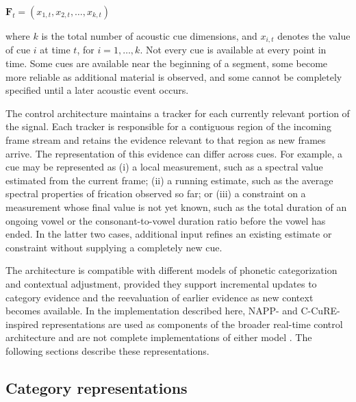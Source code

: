 \documentclass[12pt]{article}
\begin{document}
\begin{exe}
\ex $\mathbf{F}_t = (x_{1,t}, x_{2,t}, \ldots, x_{k,t})$
\end{exe}

where $k$ is the total number of acoustic cue dimensions, and $x_{i,t}$ denotes the value of cue $i$ at time $t$, for $i=1,\ldots,k$.
%
Not every cue is available at every point in time.
%
Some cues are available near the beginning of a segment, some become more reliable as additional material is observed, and some cannot be completely specified until a later acoustic event occurs. 

The control architecture maintains a tracker for each currently relevant portion of the signal.
%
Each tracker is responsible for a contiguous region of the incoming frame stream and retains the evidence relevant to that region as new frames arrive.
%
The representation of this evidence can differ across cues.
%
For example, a cue may be represented as (i) a local measurement, such as a spectral value estimated from the current frame; (ii) a running estimate, such as the average spectral properties of frication observed so far; or (iii) a constraint on a measurement whose final value is not yet known, such as the total duration of an ongoing vowel or the consonant-to-vowel duration ratio before the vowel has ended.
%
In the latter two cases, additional input refines an existing estimate or constraint without supplying a completely new cue.

The architecture is compatible with different models of phonetic categorization and contextual adjustment, provided they support incremental updates to category evidence and the reevaluation of earlier evidence as new context becomes available.
%
In the implementation described here, NAPP- and C-CuRE-inspired representations are used as components of the broader real-time control architecture and are not complete implementations of either model \citep{Nearey1997,McMurrayJongman2011}.
%
The following sections describe these representations.

\subsection{Category representations}
\end{document}
